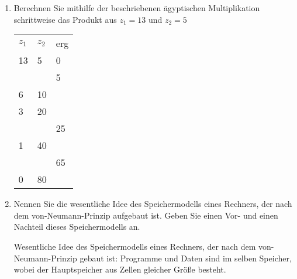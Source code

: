 \documentclass{lehramt-informatik-aufgabe}
\begin{document}
\begin{enumerate}


\item Berechnen Sie mithilfe der beschriebenen ägyptischen
Multiplikation schrittweise das Produkt aus $z_1 = 13$ und $z_2 = 5$

\begin{liAntwort}
\begin{tabular}{lll}
$z_1$ & $z_2$ & erg \\
13 & 5  & 0   \\
   &    & 5   \\
6  & 10 &     \\
3  & 20 &     \\
   &    & 25  \\
1  & 40 &     \\
   &    & 65  \\
0  & 80 &
\end{tabular}

\end{liAntwort}


\item Nennen Sie die wesentliche Idee des Speichermodells eines
Rechners, der nach dem von-Neumann-Prinzip aufgebaut ist. Geben Sie
einen Vor- und einen Nachteil dieses Speichermodells an.

\begin{liAntwort}
Wesentliche Idee des Speichermodells eines Rechners, der nach dem
von-Neumann-Prinzip gebaut ist: Programme und Daten sind im selben
Speicher, wobei der Hauptspeicher aus Zellen gleicher Größe besteht.


\end{liAntwort}
\end{enumerate}
\end{document}
